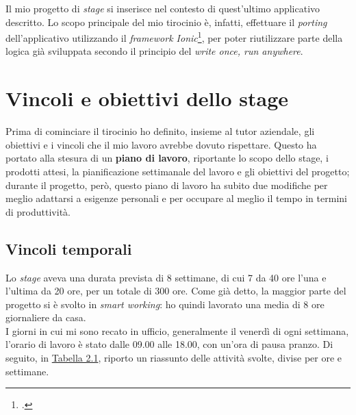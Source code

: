 Il mio progetto di \textit{stage} si inserisce nel contesto di quest'ultimo applicativo descritto. Lo scopo principale del mio tirocinio è, infatti, effettuare il \textit{porting} dell'applicativo utilizzando il \textit{framework Ionic}\footcite{tec:ionic}, per poter riutilizzare parte della logica già sviluppata secondo il principio del \textit{write once, run anywhere}.


\section{Vincoli e obiettivi dello stage}

Prima di cominciare il tirocinio ho definito, insieme al tutor aziendale, gli obiettivi e i vincoli che il mio lavoro avrebbe dovuto rispettare. Questo ha portato alla stesura di un \textbf{piano di lavoro}, riportante lo scopo dello stage, i prodotti attesi, la pianificazione settimanale del lavoro e gli obiettivi del progetto; durante il progetto, però, questo piano di lavoro ha subito due modifiche per meglio adattarsi a esigenze personali e per occupare al meglio il tempo in termini di produttività.

\subsection{Vincoli temporali}

Lo \textit{stage} aveva una durata prevista di 8 settimane, di cui 7 da 40 ore l'una e l'ultima da 20 ore, per un totale di 300 ore. Come già detto, la maggior parte del progetto si è svolto in \textit{smart working}: ho quindi lavorato una media di 8 ore giornaliere da casa. \\
I giorni in cui mi sono recato in ufficio, generalmente il venerdì di ogni settimana, l'orario di lavoro è stato dalle 09.00 alle 18.00, con un'ora di pausa pranzo. Di seguito, in \hyperref[tab:attivita-settimanali]{Tabella 2.1}, riporto un riassunto delle attività svolte, divise per ore e settimane.

